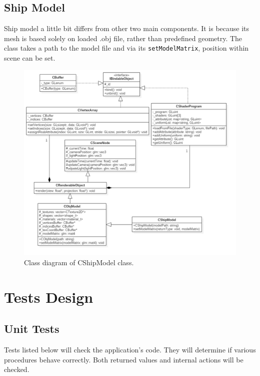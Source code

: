 \documentclass{report}
\begin{document}
\newpage
\subsection{Ship Model}
Ship model a little bit differs from other two main components. It is because its mesh is based solely on loaded .obj file, rather than predefined geometry. The class takes a path to the model file and via its \texttt{setModelMatrix}, position within scene can be set.
\begin{figure}[H]
    \centering
    \includegraphics[width=1.0\textwidth]{images/ship_model_uml.pdf}
    \caption{Class diagram of CShipModel class.}
    \label{fig:ship_model_uml}
\end{figure}

\pagebreak
\section{Tests Design}
\subsection{Unit Tests}
Tests listed below will check the application's code. They will determine if various procedures behave correctly. Both returned values and internal actions will be checked.
\end{document}
